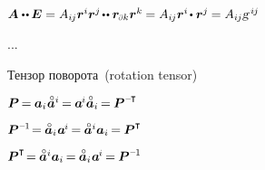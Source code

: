\begin{otherlanguage}{russian}
${
\bm{A} \dotdotp \hspace{-0.12ex} \UnitDyad
= A_{i\hspace{-0.1ex}j} \locationvector^i \locationvector^j \hspace{-0.25ex} \dotdotp \locationvector_\differentialindex{k} \locationvector^k \hspace{-0.1ex}
= A_{i\hspace{-0.1ex}j} \locationvector^i \hspace{-0.25ex} \dotp \locationvector^j \hspace{-0.1ex}
= A_{i\hspace{-0.1ex}j} \textsl{g}^{\hspace{.33ex}i\hspace{-0.1ex}j}
}$


...

Тензор поворота~(rotation tensor)

$\bm{P} \hspace{-0.2ex} = \hspace{-0.1ex} \bm{a}_i \hspace{.1ex} \mathcircabove{\bm{a}}^i \hspace{-0.2ex} = \hspace{-0.1ex} \bm{a}^{\hspace{-0.16ex}i} \mathcircabove{\bm{a}}_i \hspace{-0.2ex} = \hspace{-0.1ex} \bm{P}^{\expminusT}$

$\bm{P}^{\expminusone} \hspace{-0.4ex} = \hspace{-0.1ex} \mathcircabove{\bm{a}}_i \hspace{.1ex} \bm{a}^{\hspace{-0.16ex}i} \hspace{-0.2ex} = \hspace{-0.1ex} \mathcircabove{\bm{a}}^i \bm{a}_i \hspace{-0.2ex} = \hspace{-0.1ex} \bm{P}^{\T}$

$\bm{P}^{\T} \hspace{-0.4ex} = \hspace{-0.1ex} \mathcircabove{\bm{a}}^i \bm{a}_i \hspace{-0.2ex} = \hspace{-0.1ex} \mathcircabove{\bm{a}}_i \hspace{.1ex} \bm{a}^{\hspace{-0.16ex}i} \hspace{-0.2ex} = \hspace{-0.1ex} \bm{P}^{\expminusone}$


\end{otherlanguage}
